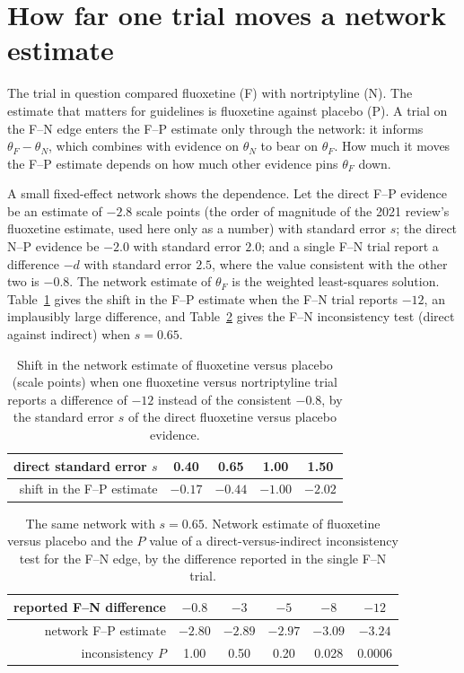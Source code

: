 \documentclass[11pt]{article}
\theoremstyle{definition}
\begin{document}
\section{How far one trial moves a network estimate}

The trial in question compared fluoxetine (F) with nortriptyline (N). The estimate that matters for guidelines is fluoxetine against placebo (P). A trial on the F--N edge enters the F--P estimate only through the network: it informs $\theta_F-\theta_N$, which combines with evidence on $\theta_N$ to bear on $\theta_F$. How much it moves the F--P estimate depends on how much other evidence pins $\theta_F$ down.

A small fixed-effect network shows the dependence. Let the direct F--P evidence be an estimate of $-2.8$ scale points (the order of magnitude of the 2021 review's fluoxetine estimate, used here only as a number) with standard error $s$; the direct N--P evidence be $-2.0$ with standard error $2.0$; and a single F--N trial report a difference $-d$ with standard error $2.5$, where the value consistent with the other two is $-0.8$. The network estimate of $\theta_F$ is the weighted least-squares solution. Table~\ref{tab:shift} gives the shift in the F--P estimate when the F--N trial reports $-12$, an implausibly large difference, and Table~\ref{tab:split} gives the F--N inconsistency test (direct against indirect) when $s=0.65$.

\begin{table}[h]
\centering
\caption{Shift in the network estimate of fluoxetine versus placebo (scale points) when one fluoxetine versus nortriptyline trial reports a difference of $-12$ instead of the consistent $-0.8$, by the standard error $s$ of the direct fluoxetine versus placebo evidence.}
\label{tab:shift}
\begin{tabular}{rcccc}
\toprule
direct standard error $s$ & 0.40 & 0.65 & 1.00 & 1.50 \\
\midrule
shift in the F--P estimate & $-0.17$ & $-0.44$ & $-1.00$ & $-2.02$ \\
\bottomrule
\end{tabular}
\end{table}

\begin{table}[h]
\centering
\caption{The same network with $s=0.65$. Network estimate of fluoxetine versus placebo and the $P$ value of a direct-versus-indirect inconsistency test for the F--N edge, by the difference reported in the single F--N trial.}
\label{tab:split}
\begin{tabular}{rccccc}
\toprule
reported F--N difference & $-0.8$ & $-3$ & $-5$ & $-8$ & $-12$ \\
\midrule
network F--P estimate & $-2.80$ & $-2.89$ & $-2.97$ & $-3.09$ & $-3.24$ \\
inconsistency $P$ & 1.00 & 0.50 & 0.20 & 0.028 & 0.0006 \\
\bottomrule
\end{tabular}
\end{table}
\end{document}
